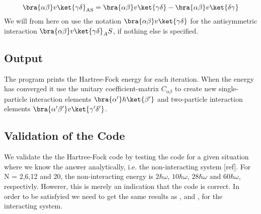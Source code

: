 \begin{equation}
\bra{\alpha \beta} v \ket{\gamma \delta}_{\text{AS}} = \bra{\alpha \beta}v\ket{\gamma \delta} - \bra{\alpha \beta}v\ket{\delta \gamma} 
  \label{antisymmetrized elements}
\end{equation}
%
We will from here on use the notation $\bra{\alpha \beta}v\ket{\gamma \delta}$ for the antisymmetric interaction $\bra{\alpha \beta}v\ket{\gamma \delta}_AS$, if nothing else is specified.


\subsection{Output}
The program prints the Hartree-Fock energy for each iteration. When the energy has converged it use the unitary coefficient-matrix $C_{\alpha \beta}$ to create new single-particle interaction elements $\bra{\alpha'}h\ket{\beta'}$
and two-particle interaction elements $\bra{\alpha'\beta'}v\ket{\gamma'\delta'}$.

\subsection{Validation of the Code}
We validate the the Hartree-Fock code by testing the code for a given situation where we know the answer analytically, i.e. the non-interacting system [ref]. For N = 2,6,12 and 20, the non-interacting energy is $2 \hbar \omega$, $10 \hbar \omega$, $28\hbar \omega$ and $60 \hbar \omega$, respectivly. Howerer, this is merely an indication that the code is correct. In order to be satisfyied we need to get the same results as \cite{lohne},\cite{merlot} and \cite{lohne-article}, for the interacting system. 


